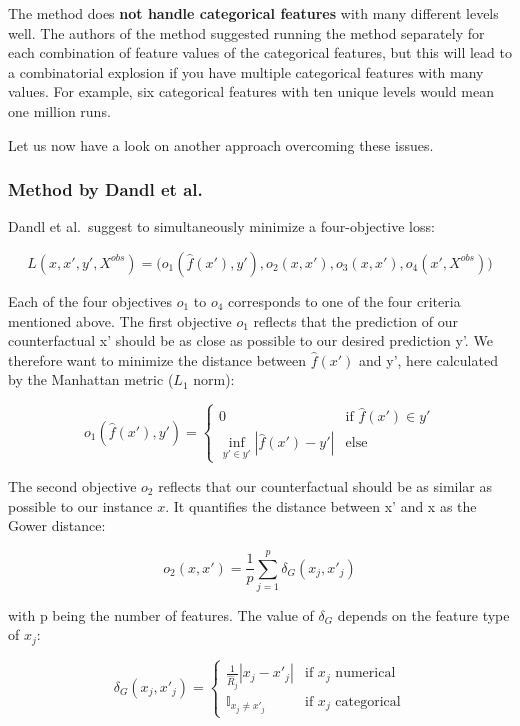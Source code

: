 \documentclass[
  11pt,
]{scrbook}
\begin{document}
The method does \textbf{not handle categorical features} with many different levels well.
The authors of the method suggested running the method separately for each combination of feature values of the categorical features, but this will lead to a combinatorial explosion if you have multiple categorical features with many values.
For example, six categorical features with ten unique levels would mean one million runs.

Let us now have a look on another approach overcoming these issues.

\hypertarget{method-by-dandl-et-al.}{%
\subsubsection{Method by Dandl et al.~}\label{method-by-dandl-et-al.}}

Dandl et al.~suggest to simultaneously minimize a four-objective loss:

\[L(x,x',y',X^{obs})=\big(o_1(\hat{f}(x'),y'),o_2(x, x'),o_3(x,x'),o_4(x',X^{obs})\big) \]

Each of the four objectives \(o_1\) to \(o_4\) corresponds to one of the four criteria mentioned above.
The first objective \(o_1\) reflects that the prediction of our counterfactual x' should be as close as possible to our desired prediction y'.
We therefore want to minimize the distance between \(\hat{f}(x')\) and y', here calculated by the Manhattan metric (\(L_1\) norm):

\[o_1(\hat{f}(x'),y')=\begin{cases}0&\text{if $\hat{f}(x')\in{}y'$}\\\inf\limits_{y'\in y'}|\hat{f}(x')-y'|&\text{else}\end{cases}\]

The second objective \(o_2\) reflects that our counterfactual should be as similar as possible to our instance \(x\).
It quantifies the distance between x' and x
as the Gower distance:

\[o_2(x,x')=\frac{1}{p}\sum_{j=1}^{p}\delta_G(x_j, x'_j)\]

with p being the number of features.
The value of \(\delta_G\) depends on the feature type of \(x_j\):

\[\delta_G(x_j,x'_j)=\begin{cases}\frac{1}{\widehat{R}_j}|x_j-x'_j|&\text{if $x_j$ numerical}\\\mathbb{I}_{x_j\neq{}x'_j}&\text{if $x_j$ categorical}\end{cases}\]
\end{document}
